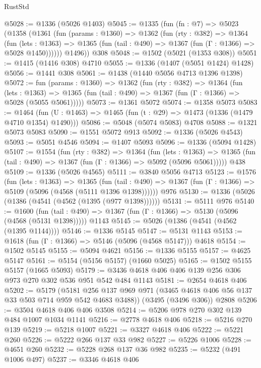 \begin{lexlean}{RustStd}
\begin{coremodule}
{\begin{coremodule}
{{{{{{{{{{{{{{@5028 := @1336 (@5026 @1403)
@5045 := @1335
    (fun (fn : @7) =>
    @5023
      (@1358
        (@1361
          (fun (params : @1360) =>
          @1362
            (fun (rty : @382) =>
            @1364
              (fun (lets : @1363) =>
              @1365 (fun (tail : @490) => @1367 (fun (Γ : @1366) => @5028 @1450))))))
        @1496))
    @308
@5048 := @1502 (@5021 (@1353 @308))
@5051 := @1415 (@1416 @308) @4710
@5055 := @1336 (@1407 (@5051 @1424) @1428)
@5056 := @1441 @308
@5061 := @1438 (@1440 @5056 @4713 @1396 @1398)
@5072 := fun (params : @1360) =>
  @1362
    (fun (rty : @382) =>
    @1364
      (fun (lets : @1363) =>
      @1365 (fun (tail : @490) => @1367 (fun (Γ : @1366) => @5028 (@5055 @5061)))))
@5073 := @1361 @5072
@5074 := @1358 @5073
@5083 := @1464 (fun (U : @1463) => @1465 (fun (t : @29) => @1473 (@1336 (@1479 @4710 @1354) @1490)))
@5086 := @5048 (@5074 @5083) @4708
@5088 := @1321 @5073 @5083
@5090 := @1551 @5072 @913
@5092 := @1336 (@5026 @4543)
@5093 := @5051 @4546
@5094 := @1407 @5093
@5096 := @1336 (@5094 @1428)
@5107 := @1554
    (fun (rty : @382) =>
    @1364
      (fun (lets : @1363) =>
      @1365 (fun (tail : @490) => @1367 (fun (Γ : @1366) => @5092 (@5096 @5061)))))
    @438
@5109 := @1336 (@5026 @4565)
@5111 := @3840 @5056 @4713
@5123 := @1576
    (fun (lets : @1363) =>
    @1365
      (fun (tail : @490) => @1367 (fun (Γ : @1366) => @5109 (@5096 (@4568 (@5111 @1396 @1398))))))
    @976
@5130 := @1336 (@5026 (@1386 (@4541 (@4562 (@1395 (@977 @1398))))))
@5131 := @5111 @976
@5140 := @1600
    (fun (tail : @490) => @1367 (fun (Γ : @1366) => @5130 (@5096 (@4568 (@5131 @1398)))))
    @1143
@5145 := @5026 (@1386 (@4541 (@4562 (@1395 @1144))))
@5146 := @1336 @5145
@5147 := @5131 @1143
@5153 := @1618 (fun (Γ : @1366) => @5146 (@5096 (@4568 @5147))) @4618
@5154 := @1502 @5145
@5155 := @5094 @4621
@5156 := @1336 @5155
@5157 := @4625 @5147
@5161 := @5154 (@5156 @5157) (@1660 @5025)
@5165 := @1502 @5155 @5157 (@1665 @5093)
@5179 := @3436 @4618 @406 @406 @139 @256 @306 @973 @270 @302 @536 @951 @542 @484 @1143
@5181 := @2654 @4618 @406
@5202 := @5179
    (@5181 @256 @137 @969 @971 (@3465 @4618 @406 @56 @137 @33 @503 @714 @959 @542 @4683 @3488))
    (@3495 (@3496 @306))
    @2808
@5206 := @3504 @4618 @406 @406 @3508
@5214 := @5206 @978 @270 @302 @139 @484 @1007 @1034 @1141
@5216 := @2778 @4618 @406
@5218 := @5216 @270 @139
@5219 := @5218 @1007
@5221 := @3327 @4618 @406
@5222 := @5221 @260
@5226 := @5222 @266 @137 @33 @982
@5227 := @5226 @1006
@5228 := @4651 @260
@5232 := @5228 @268 @137 @36 @982
@5235 := @5232 (@491 @1006 @497)
@5237 := @3346 @4618 @406
}}}}}}}}}}}}}}
\end{coremodule}}
\end{coremodule}
\end{lexlean}
